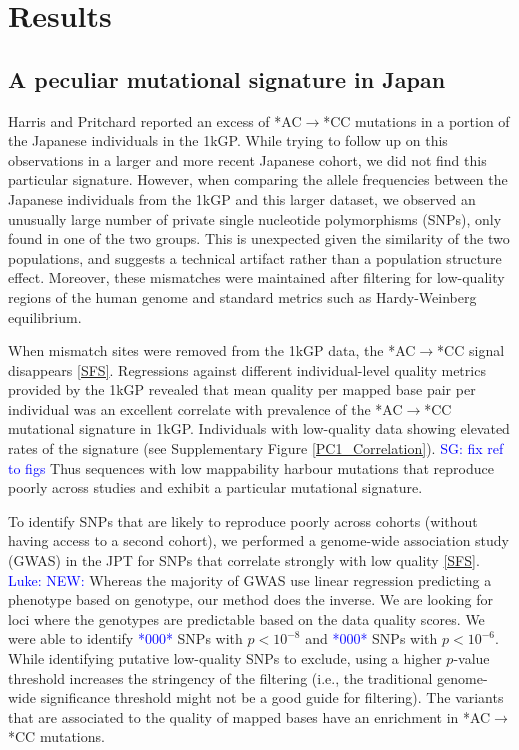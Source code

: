 \documentclass[9pt,lineno]{elife}
\newcommand{\sgcomment}[1]{\textcolor{blue}{SG: #1}}
\newcommand{\luke}[1]{\textcolor{blue}{Luke: #1}}
\newcommand{\todo}[1]{\textcolor{blue}{*#1*}}
\begin{document}
			\section{Results}
	\subsection{A peculiar mutational signature in Japan}			
	
Harris and Pritchard reported an excess of *AC${\rightarrow}$*CC mutations in a portion of the Japanese individuals in the 1kGP.
While trying to follow up on this observations in a larger and more recent Japanese cohort, we did not find this particular signature.
However, when comparing the allele frequencies between the Japanese individuals from the 1kGP and this larger dataset, we observed an unusually large number of private single nucleotide polymorphisms (SNPs), only found in one of the two groups.
This is unexpected given the similarity of the two populations, and suggests a technical artifact rather than a population structure effect. 
Moreover, these mismatches were maintained after filtering for low-quality regions of the human genome and standard metrics such as Hardy-Weinberg equilibrium.

When mismatch sites were removed from the 1kGP data, the  *AC${\rightarrow}$*CC signal disappears \ref{SFS}.
Regressions against different individual-level quality metrics provided by the 1kGP revealed that mean quality per mapped base pair per individual was an excellent correlate with prevalence of the  *AC${\rightarrow}$*CC mutational signature in 1kGP. 
Individuals with low-quality data showing elevated rates of the signature (see Supplementary Figure \ref{PC1_Correlation}). \sgcomment{fix ref to figs}
Thus sequences with low mappability harbour mutations that reproduce poorly across studies and exhibit a particular mutational signature. 

To identify SNPs that are likely to reproduce poorly across cohorts (without having access to a second cohort), we performed a genome-wide association study (GWAS) in the JPT for SNPs that correlate strongly with low quality \ref{SFS}.
\luke{NEW:} 
Whereas the majority of GWAS use linear regression predicting a phenotype based on genotype, our method does the inverse.
We are looking for loci where the genotypes are predictable based on the data quality scores.
We were able to identify \todo{000} SNPs with $p < 10^{-8}$ and \todo{000} SNPs with $ p < 10^{-6}$.
While identifying putative low-quality SNPs to exclude, using a higher $p$-value threshold increases the stringency of the filtering (i.e., the traditional genome-wide significance threshold might not be a good guide for filtering).  
The variants that are associated to the quality of mapped bases have an enrichment in *AC${\rightarrow}$*CC mutations. 
\end{document}
